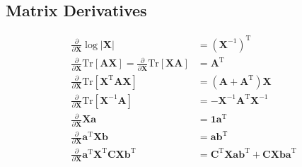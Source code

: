 \documentclass[a4paper]{article}
\begin{document}
\subsection{Matrix Derivatives}
\begin{align*}
\frac{\partial}{\partial\mathbf{X}}\log|\mathbf{X}| &= {(\mathbf{X}^{-1})}^\textrm{T}\\
\frac{\partial}{\partial\mathbf{X}}\textrm{Tr}[\mathbf{AX}] = \frac{\partial}{\partial\mathbf{X}}\textrm{Tr}[\mathbf{XA}] &= \mathbf{A}^\textrm{T} \\
\frac{\partial}{\partial\mathbf{X}}\textrm{Tr}[\mathbf{X}^\textrm{T}\mathbf{AX}] &= (\mathbf{A} + \mathbf{A}^\textrm{T})\mathbf{X} \\
\frac{\partial}{\partial\mathbf{X}}\textrm{Tr}[\mathbf{X}^{-1}\mathbf{A}] &= -\mathbf{X}^{-1}\mathbf{A}^\textrm{T}\mathbf{X}^{-1} \\
\frac{\partial}{\partial\mathbf{X}}\mathbf{Xa} &= \mathbf{1a}^\textrm{T} \\
\frac{\partial}{\partial\mathbf{X}}\mathbf{a}^\textrm{T}\mathbf{Xb} &= \mathbf{ab}^\textrm{T} \\
\frac{\partial}{\partial\mathbf{X}}\mathbf{a}^\textrm{T}\mathbf{X}^\textrm{T}\mathbf{CXb}^\textrm{T} &= \mathbf{C}^\textrm{T}\mathbf{Xab}^\textrm{T} + \mathbf{CXba}^\textrm{T}
\end{align*}
\end{document}
